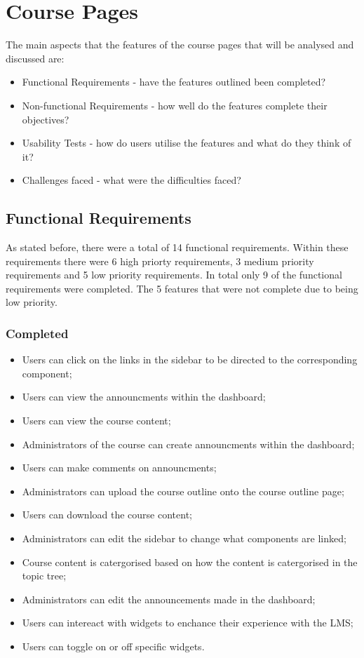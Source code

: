 \section{Course Pages}

The main aspects that the features of the course pages that will be analysed and discussed are:
\begin{itemize}
    \item Functional Requirements - have the features outlined been completed?
    \item Non-functional Requirements - how well do the features complete their objectives?
    \item Usability Tests - how do users utilise the features and what do they think of it?
    \item Challenges faced - what were the difficulties faced?
\end{itemize}

\subsection{Functional Requirements}
As stated before, there were a total of 14 functional requirements. Within these requirements there were 6 high priorty requirements, 3 medium priority requirements and 5 low priority requirements.
In total only 9 of the functional requirements were completed. The 5 features that were not complete due to being low priority.

\subsubsection{Completed}
\begin{itemize}
    \item Users can click on the links in the sidebar to be directed to the corresponding component;
    \item Users can view the announcments within the dashboard;
    \item Users can view the course content;
    \item Administrators of the course can create announcments within the dashboard;
    \item Users can make comments on announcments;
    \item Administrators can upload the course outline onto the course outline page;
    \item Users can download the course content;
    \item Administrators can edit the sidebar to change what components are linked;
    \item Course content is catergorised based on how the content is catergorised in the topic tree;
    \item Administrators can edit the announcements made in the dashboard;
    \item Users can intereact with widgets to enchance their experience with the LMS;
    \item Users can toggle on or off specific widgets.
\end{itemize}


